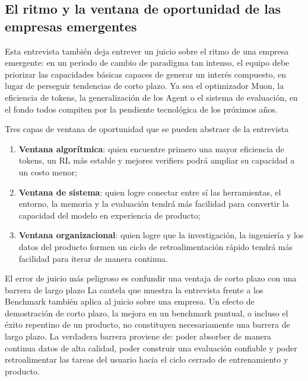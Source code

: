 \subsection{El ritmo y la ventana de oportunidad de las empresas emergentes}
Esta entrevista también deja entrever un juicio sobre el ritmo de una empresa emergente: en un periodo de cambio de paradigma tan intenso, el equipo debe priorizar las capacidades básicas capaces de generar un interés compuesto, en lugar de perseguir tendencias de corto plazo. Ya sea el optimizador Muon, la eficiencia de tokens, la generalización de los Agent o el sistema de evaluación, en el fondo todos compiten por la pendiente tecnológica de los próximos años.

\begin{knowledgebox}{Tres capas de ventana de oportunidad que se pueden abstraer de la entrevista}
\begin{enumerate}
    \item \textbf{Ventana algorítmica}: quien encuentre primero una mayor eficiencia de tokens, un RL más estable y mejores verifiers podrá ampliar su capacidad a un costo menor;
    \item \textbf{Ventana de sistema}: quien logre conectar entre sí las herramientas, el entorno, la memoria y la evaluación tendrá más facilidad para convertir la capacidad del modelo en experiencia de producto;
    \item \textbf{Ventana organizacional}: quien logre que la investigación, la ingeniería y los datos del producto formen un ciclo de retroalimentación rápido tendrá más facilidad para iterar de manera continua.
\end{enumerate}
\end{knowledgebox}

\begin{warningbox}{El error de juicio más peligroso es confundir una ventaja de corto plazo con una barrera de largo plazo}
La cautela que muestra la entrevista frente a los Benchmark también aplica al juicio sobre una empresa. Un efecto de demostración de corto plazo, la mejora en un benchmark puntual, o incluso el éxito repentino de un producto, no constituyen necesariamente una barrera de largo plazo. La verdadera barrera proviene de: poder absorber de manera continua datos de alta calidad, poder construir una evaluación confiable y poder retroalimentar las tareas del usuario hacia el ciclo cerrado de entrenamiento y producto.
\end{warningbox}


